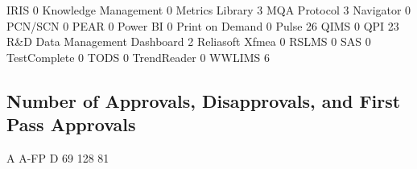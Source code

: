 \documentclass{article}
\begin{document}
\begin{Schunk}
\begin{Soutput}
                                    IRIS 
                                       0 
                    Knowledge Management 
                                       0 
                         Metrics Library 
                                       3 
                            MQA Protocol 
                                       3 
                               Navigator 
                                       0 
                                 PCN/SCN 
                                       0 
                                    PEAR 
                                       0 
                                Power BI 
                                       0 
                         Print on Demand 
                                       0 
                                   Pulse 
                                      26 
                                    QIMS 
                                       0 
                                     QPI 
                                      23 
           R&D Data Management Dashboard 
                                       2 
                         Reliasoft Xfmea 
                                       0 
                                   RSLMS 
                                       0 
                                     SAS 
                                       0 
                            TestComplete 
                                       0 
                                    TODS 
                                       0 
                             TrendReader 
                                       0 
                                  WWLIMS 
                                       6 
\end{Soutput}
\end{Schunk}

\subsection{Number of Approvals, Disapprovals, and First Pass Approvals}

\begin{Schunk}
\begin{Soutput}
   A A-FP    D 
  69  128   81 
\end{Soutput}
\end{Schunk}
\end{document}
